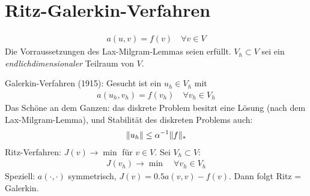 \section{Ritz-Galerkin-Verfahren}
\begin{align*}
  a(u, v )= f(v) \quad \forall v \in V
\end{align*}
Die Vorraussetzungen des Lax-Milgram-Lemmas seien erfüllt. $V_h \subset V$ sei ein \emph{endlichdimensionaler} Teilraum von $V$. 

Galerkin-Verfahren (1915): Gesucht ist ein $u_h \in V_h$ mit 
\begin{align*}
  a(u_h, v_h) = f(v_h) \quad \forall v_h \in V_h
\end{align*}
Das Schöne an dem Ganzen: das diskrete Problem besitzt eine Lösung (nach dem Lax-Milgram-Lemma), und Stabilität des diskreten Problems auch:
\begin{align*}
  \|u_h\| \leq \alpha^{-1} \|f\| _*
\end{align*}
Ritz-Verfahren: $J(v) \to \min$ für $v \in V$. Sei $V_h \subset V$:
\begin{align*}
  J(v_h) \to \min \quad \forall v_h \in V_h
\end{align*}
Speziell: $a(\cdot, \cdot)$ symmetrisch, $J(v) = 0.5 a(v, v) - f(v)$.
Dann folgt Ritz = Galerkin.

